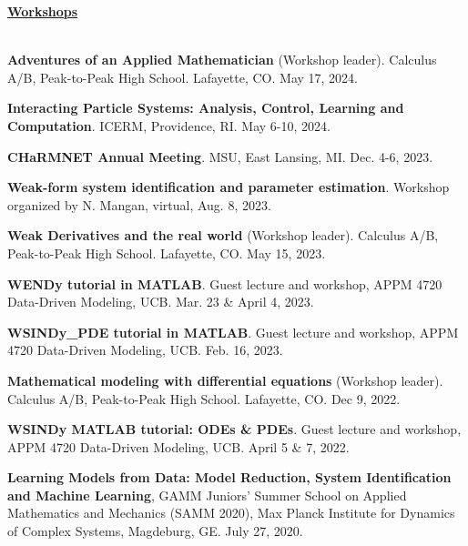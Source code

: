 \documentclass[letterpaper,11pt,oneside]{article}
\newcommand{\headr}[1]{\vspace{10pt}\uline{\Large{\textbf{#1}} \hfill } \\ \vspace{-10pt}\\}
\begin{document}
\headr{Workshops}
\vspace{-0.5cm}
\begin{enumerate}[label={[\arabic*]}]
\item \textbf{Adventures of an Applied Mathematician} (Workshop leader). Calculus A/B, Peak-to-Peak High School. Lafayette, CO. May 17, 2024.
\item \textbf{Interacting Particle Systems: Analysis, Control, Learning and Computation}. ICERM, Providence, RI. May 6-10, 2024.
\item \textbf{CHaRMNET Annual Meeting}. MSU, East Lansing, MI. Dec. 4-6, 2023.
\item \textbf{Weak-form system identification and parameter estimation}. Workshop organized by N. Mangan, virtual, Aug. 8, 2023.
\item \textbf{Weak Derivatives and the real world} (Workshop leader). Calculus A/B, Peak-to-Peak High School. Lafayette, CO. May 15, 2023.
\item \textbf{WENDy tutorial in MATLAB}. Guest lecture and workshop, APPM 4720 Data-Driven Modeling, UCB. Mar. 23 \& April 4, 2023.
\item \textbf{WSINDy\_PDE tutorial in MATLAB}. Guest lecture and workshop, APPM 4720 Data-Driven Modeling, UCB. Feb. 16, 2023.
\item \textbf{Mathematical modeling with differential equations} (Workshop leader). 
Calculus A/B, Peak-to-Peak High School. Lafayette, CO. Dec 9, 2022.
\item \textbf{WSINDy MATLAB tutorial: ODEs \& PDEs}. Guest lecture and workshop, APPM 4720 Data-Driven Modeling, UCB. April 5 \& 7, 2022.
\item \textbf{Learning Models from Data: Model Reduction, System Identification and Machine Learning}, GAMM Juniors' Summer School on Applied Mathematics and Mechanics (SAMM 2020), Max Planck Institute for Dynamics of Complex Systems, Magdeburg, GE. July 27, 2020.
\end{enumerate}
\end{document}
